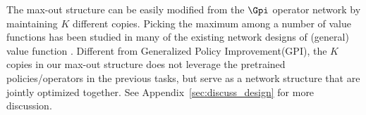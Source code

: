 The max-out structure can be easily modified from the $\Gpi$ operator network by maintaining $K$ different copies.
Picking the maximum among a number of value functions has been studied in many of the existing network designs of (general) value function \citep[e.g.][]{barreto2017successor, barreto2020fast, berthier2020max}.
Different from Generalized Policy Improvement(GPI), the $K$ copies in our max-out structure does not leverage the pretrained policies/operators in the previous tasks, but serve as a network structure that are jointly optimized together. See Appendix~\ref{sec:discuss_design} for more discussion.
